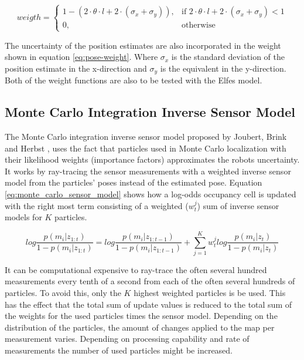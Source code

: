 \begin{equation}
\label{eq:pose-weight}
weigth = 
\begin{cases}
1 - ( 2 \cdot \theta \cdot l + 2 \cdot (\sigma_x + \sigma_y) ), & \text{if } 2 \cdot \theta \cdot l + 2 \cdot (\sigma_x + \sigma_y) < 1\\
0, & \text{otherwise}
\end{cases}
\end{equation}

The uncertainty of the position estimates are also incorporated in the weight shown in equation \vref{eq:pose-weight}.
Where \(\sigma_x\) is the standard deviation of the position estimate in the x-direction and \(\sigma_y\) is the equivalent in the y-direction.
Both of the weight functions are also to be tested with the Elfes model.

\subsection{Monte Carlo Integration Inverse Sensor Model}
\label{sec:monte_carlo_sensor Model}
The Monte Carlo integration inverse sensor model proposed by Joubert, Brink and Herbst \cite{Joubert2014},  uses the fact that particles used in Monte Carlo localization with their likelihood weights (importance factors) approximates the robots uncertainty. 
It works by ray-tracing the sensor measurements with a weighted inverse sensor model from the particles' poses instead of the estimated pose. 
Equation \vref{eq:monte_carlo_sensor_model} shows how a log-odds occupancy cell is updated with the right most term consisting of a weighted ($w_t^j$) sum of inverse sensor models for $K$ particles.

\begin{equation}
log \frac{p(m_i|z_{1:t})}{1-p(m_i|z_{1:t})} = log \frac{p(m_i|z_{1:t-1})}{1-p(m_i|z_{1:t-1})} + \sum_{j=1}^{K} w_t^j log \frac{ p(m_i | z_t) }{ 1 - p(m_i | z_t) }
\label{eq:monte_carlo_sensor_model}
\end{equation}

It can be computational expensive to ray-trace the often several hundred measurements every tenth of a second from each of the often several hundreds of particles.
To avoid this, only the $K$ highest weighted particles is be used. 
This has the effect that the total sum of update values is reduced to the total sum of the weights for the used particles times the sensor model.
Depending on the distribution of the particles, the amount of changes applied to the map per measurement varies.
Depending on processing capability and rate of measurements the number of used particles might be increased.


